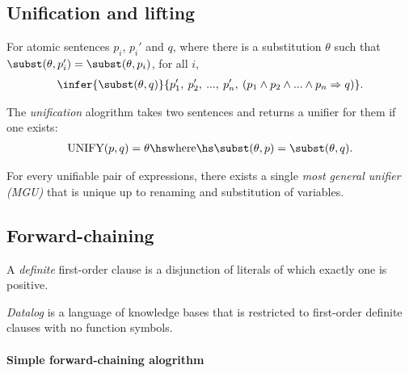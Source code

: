 \documentclass{article}
\begin{document}
\subsection{Unification and lifting}

\begin{theorem}
    For atomic sentences $p_i$, $p_i'$ and $q$, where there is a substitution
    $\theta$ such that $\subst(\theta,p_i')=\subst(\theta,p_i)$, for
    all $i$,
    \begin{align*}
        \infer{\subst(\theta,q)}{p_1',\: p_2',\: ...,\: p_n',\:(p_1\wedge p_2 \wedge ... \wedge p_n\Rightarrow q)}.
    \end{align*}
\end{theorem}

\begin{definition}
    The \emph{unification} alogrithm takes two sentences and returns a unifier
    for them if one exists:
    \begin{align*}
        \text{UNIFY}(p,q)=\theta \hs\text{where}\hs \subst(\theta,p)=\subst(\theta,q).
    \end{align*}
\end{definition}

\begin{theorem}
    For every unifiable pair of expressions, there exists a single \emph{most general
    unifier (MGU)} that is unique up to renaming and substitution of variables.
\end{theorem}

\subsection{Forward-chaining}

\begin{definition}
    A \emph{definite} first-order clause is a disjunction of literals of which exactly
    one is positive.
\end{definition}

\begin{definition}
    \emph{Datalog} is a language of knowledge bases that is restricted to first-order
    definite clauses with no function symbols.
\end{definition}

\paragraph{Simple forward-chaining alogrithm}
\end{document}
